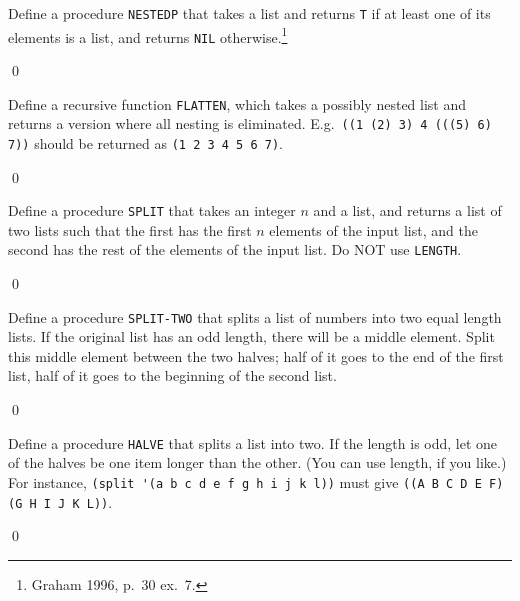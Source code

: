 \documentclass[a4paper,11pt]{article}
\begin{document}
\begin{uexercise}
Define a procedure \Verb+NESTEDP+ that takes a list and returns \Verb+T+ if at least one of its elements is a list, and returns \Verb+NIL+ otherwise.\footnote{Graham 1996, p.\ 30 ex.\ 7.}

\qed
\end{uexercise}

\begin{uexercise}

Define a recursive function \Verb+FLATTEN+, which takes a possibly nested list and returns a version where all nesting is eliminated. E.g.\ \Verb+((1 (2) 3) 4 (((5) 6) 7))+ should be returned as \Verb+(1 2 3 4 5 6 7)+. 

\qed
\end{uexercise}

\begin{uexercise}
Define a procedure \Verb+SPLIT+ that takes an integer $n$ and a list, and returns a list of two lists such that the first has the first $n$ elements of the input list, and the second has the rest of the elements of the input list. Do NOT use \Verb+LENGTH+.

\qed
\end{uexercise}

\begin{uexercise}
Define a procedure \Verb+SPLIT-TWO+ that splits a list of numbers into two equal length lists. If the original list has an odd length, there will be a middle element. Split this middle element between the two halves; half of it goes to the end of the first list, half of it goes to the beginning of the second list.

\qed
\end{uexercise}

\begin{uexercise}
\label{halve}

Define a procedure \Verb+HALVE+ that splits a list into two. If the
length is odd, let one of the halves be one item longer than the
other. (You can use length, if you like.)  For instance, \Verb+(split '(a b c d e f g h i j k l))+
must give \Verb+((A B C D E F) (G H I J K L))+.

\qed
\end{uexercise}
\end{document}
